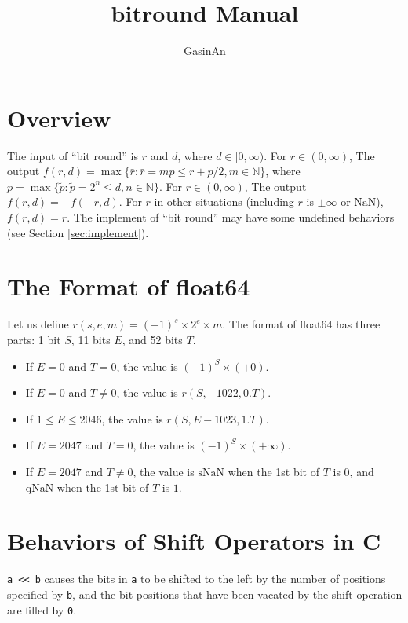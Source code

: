 \documentclass[a4paper,12pt]{article}
\title{bitround Manual}
\author{GasinAn}
\begin{document}
    \maketitle

    \tableofcontents

    \section{Overview}

    The input of ``bit round'' is $r$ and $d$, where $d\in[0,\infty)$. For $r\in(0,\infty)$, The output $f(r,d)=\max\{\bar{r}:\bar{r}=mp\leq r+p/2,m\in\mathbb{N}\}$, where $p=\max\{\tilde{p}:\tilde{p}=2^n\leq d,n\in\mathbb{N}\}$. For $r\in(0,\infty)$, The output $f(r,d)=-f(-r,d)$. For $r$ in other situations (including $r$ is $\pm\infty$ or $\text{NaN}$), $f(r,d)=r$. The implement of ``bit round'' may have some undefined behaviors (see Section \ref{sec:implement}).

    \section{The Format of float64}

    Let us define $r(s,e,m)=(-1)^s\times2^e\times m$. The format of float64 has three parts: 1 bit $S$, 11 bits $E$, and 52 bits $T$.
    \begin{itemize}
        \item If $E=0$ and $T=0$, the value is $(-1)^S\times(+0)$.
        \item If $E=0$ and $T\neq0$, the value is $r(S,-1022,0.T)$.
        \item If $1\leq E\leq2046$, the value is $r(S,E-1023,1.T)$.
        \item If $E=2047$ and $T=0$, the value is $(-1)^S\times(+\infty)$.
        \item If $E=2047$ and $T\neq0$, the value is $\text{sNaN}$ when the 1st bit of $T$ is $0$, and $\text{qNaN}$ when the 1st bit of $T$ is $1$.
    \end{itemize}

    \section{Behaviors of Shift Operators in C}

    \verb|a << b| causes the bits in \verb|a| to be shifted to the left by the number of positions specified by \verb|b|, and the bit positions that have been vacated by the shift operation are filled by \verb|0|.
\end{document}

